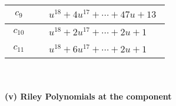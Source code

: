 \documentclass[1p]{elsarticle_modified}
\theoremstyle{definition}
\begin{document}
\begin{tabular}{m{50pt}|m{274pt}}
\hline $$\begin{aligned}c_{9}\end{aligned}$$&$\begin{aligned}
&u^{18}+4 u^{17}+\cdots+47 u+13
\end{aligned}$\\
\hline $$\begin{aligned}c_{10}\end{aligned}$$&$\begin{aligned}
&u^{18}+2 u^{17}+\cdots+2 u+1
\end{aligned}$\\
\hline $$\begin{aligned}c_{11}\end{aligned}$$&$\begin{aligned}
&u^{18}+6 u^{17}+\cdots+2 u+1
\end{aligned}$\\
\hline
\end{tabular}\\~\\
\newpage\renewcommand{\arraystretch}{1}
\flushleft \textbf{(v) Riley Polynomials at the component}\newline \\
\end{document}
